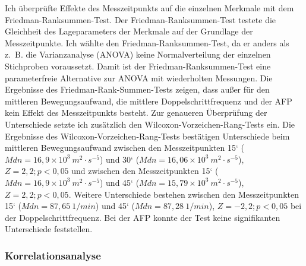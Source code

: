 Ich überprüfte Effekte des Messzeitpunkts auf die einzelnen Merkmale mit dem Friedman-Ranksummen-Test. Der Friedman-Ranksummen-Test testete die Gleichheit des Lageparameters der Merkmale auf der Grundlage der Messzeitpunkte. Ich wählte den Friedman-Ranksummen-Test, da er anders als z.~B. die Varianzanalyse (ANOVA) keine Normalverteilung der einzelnen Stichproben voraussetzt. Damit ist der Friedman-Ranksummen-Test eine parameterfreie Alternative zur ANOVA mit wiederholten Messungen. Die Ergebnisse des Friedman-Rank-Summen-Tests zeigen, dass außer für den mittleren Bewegungsaufwand, die mittlere Doppelschrittfrequenz und der \ac{AFP} kein Effekt des Messzeitpunkts besteht. Zur genaueren Überprüfung der Unterschiede setzte ich zusätzlich den Wilcoxon-Vorzeichen-Rang-Tests ein. Die Ergebnisse des Wilcoxon-Vorzeichen-Rang-Tests bestätigen Unterschiede beim mittleren Bewegungsaufwand zwischen den Messzeitpunkten 15‘ ($Mdn = 16{,}9 \times 10^3 \: m^2 \cdot s^{-5}$) und 30‘ ($Mdn = 16{,}06 \times 10^3 \: m^2 \cdot s^{-5}$), $Z = 2{,}2; p < 0{,}05$ und zwischen den Messzeitpunkten 15‘ ($Mdn = 16{,}9 \times 10^3 \: m^2 \cdot s^{-5}$) und 45‘ ($Mdn = 15{,}79 \times 10^3 \: m^2 \cdot s^{-5}$), $Z = 2{,}2; p < 0{,}05$. Weitere Unterschiede bestehen zwischen den Messzeitpunkten 15‘ ($Mdn = 87{,}65 \: 1/min$) und 45‘ ($Mdn = 87{,}28 \: 1/min$), $Z = -2{,}2; p < 0{,}05$ bei der Doppelschrittfrequenz. Bei der \ac{AFP} konnte der Test keine signifikanten Unterschiede feststellen. 

\subsubsection{Korrelationsanalyse} 

\label{subs:korrelationsanalyse_5_1}

